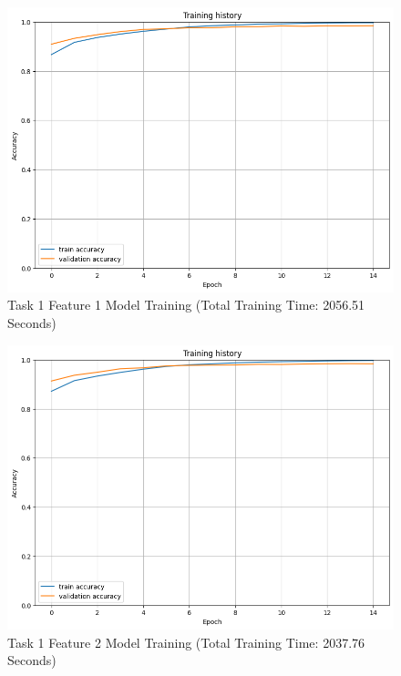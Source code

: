 \documentclass[10.7pt, onecolumn]{article}
\begin{document}
\begin{figure}[H]
  \centering
  \includegraphics[]{images/model2_task1_feature1_plot.png}
  \caption{Task 1 Feature 1 Model Training (Total Training Time: 2056.51 Seconds)}
  \label{fig:t1f1plot}
\end{figure}

\begin{figure}[H]
  \centering
  \includegraphics[]{images/model2_task1_feature2_plot.png}
  \caption{Task 1 Feature 2 Model Training (Total Training Time: 2037.76 Seconds)}
  \label{fig:t1f2plot}
\end{figure}
\end{document}
